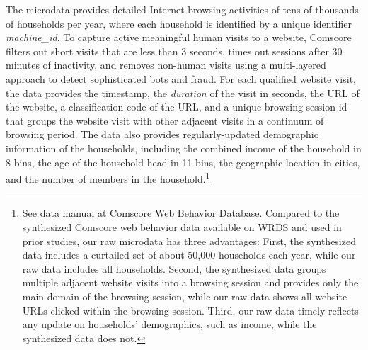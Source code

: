 \documentclass[12pt]{article}
\begin{document}
The microdata provides detailed Internet browsing activities of tens of thousands of households per year, where each household is identified by a unique identifier \textit{machine\_id}. To capture active meaningful human visits to a website, Comscore filters out short visits that are less than 3 seconds, times out sessions after 30 minutes of inactivity, and removes non-human visits using a multi-layered approach to detect sophisticated bots and fraud. For each qualified website visit, the data provides the timestamp, the \textit{duration} of the visit in seconds, the URL of the website, a classification code of the URL, and a unique browsing session id that groups the website visit with other adjacent visits in a continuum of browsing period. The data also provides regularly-updated demographic information of the households, including the combined income of the household in 8 bins, the age of the household head in 11 bins, the geographic location in cities, and the number of members in the household.\footnote{See data manual at \href{https://wrds-www.wharton.upenn.edu/documents/1008/Comscore_Web_Behavior_Database_August_2022.pdf}{Comscore Web Behavior Database}. Compared to the synthesized Comscore web behavior data available on WRDS and used in prior studies, our raw microdata has three advantages: First, the synthesized data includes a curtailed set of about 50,000 households each year, while our raw data includes all households. Second, the synthesized data groups multiple adjacent website visits into a browsing session and provides only the main domain of the browsing session, while our raw data shows all website URLs clicked within the browsing session. Third,  our raw data timely reflects any update on households' demographics, such as income, while the synthesized data does not.}

\end{document}

